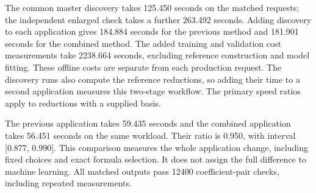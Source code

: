 The common master discovery takes 125.450 seconds on the matched requests; the independent enlarged check takes a further 263.492 seconds. Adding discovery to each application gives 184.884 seconds for the previous method and 181.901 seconds for the combined method. The added training and validation cost measurements take 2238.664 seconds, excluding reference construction and model fitting. These offline costs are separate from each production request. The discovery runs also compute the reference reductions, so adding their time to a second application measures this two-stage workflow. The primary speed ratios apply to reductions with a supplied basis.

The previous application takes 59.435 seconds and the combined application takes 56.451 seconds on the same workload. Their ratio is 0.950, with interval [0.877, 0.990]. This comparison measures the whole application change, including fixed choices and exact formula selection. It does not assign the full difference to machine learning. All matched outputs pass 12400 coefficient-pair checks, including repeated measurements.

